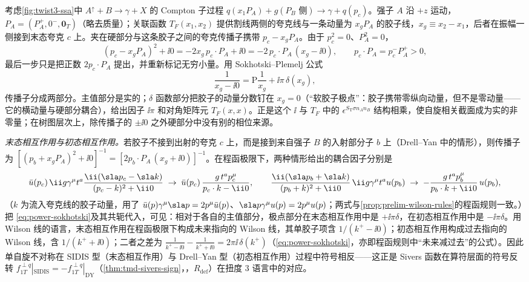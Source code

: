 \begin{example}[最低阶的软胶子极点机制]\label{ex:power-sgp}
考虑\cref{fig:twist3-ssa}中 $A^\uparrow+B\to\gamma+X$ 的 Compton 子过程 $q(x_1P_A)+g(P_B\text{ 侧})\to\gamma+q(p_c)$。强子 $A$ 沿 $+z$ 运动，$P_A=(P_A^+,0^-,\mathbf0_T)$（略去质量）；关联函数 $T_F(x_1,x_2)$ 提供割线两侧的夸克线与一条动量为 $x_gP_A$ 的胶子线，$x_g\equiv x_2-x_1$，后者在振幅一侧接到末态夸克 $c$ 上。夹在硬部分与这条胶子之间的夸克传播子携带 $p_c-x_gP_A$。由于 $p_c^2=0$、$P_A^2=0$，
\begin{equation}\label{eq:power-sgp-den}
(p_c-x_gP_A)^2+\ii0=-2x_g\,p_c\cdot P_A+\ii0=-2\,p_c\cdot P_A\,(x_g-\ii0),\qquad p_c\cdot P_A=p_c^-P_A^+>0,
\end{equation}
最后一步只是把正数 $2p_c\cdot P_A$ 提出，并重新标记无穷小量。用 Sokhotski--Plemelj 公式
\begin{equation}\label{eq:power-sokhotski}
\frac{1}{x_g-\ii0}=\mathrm P\frac{1}{x_g}+\ii\pi\,\delta(x_g),
\end{equation}
传播子分成两部分。主值部分是实的；$\delta$ 函数部分把胶子的动量分数钉在 $x_g=0$（“软胶子极点”：胶子携带零纵向动量，但不是零动量——它的横动量与硬部分耦合），给出因子 $\ii\pi$ 和对角矩阵元 $T_F(x,x)$。正是这个 $\ii$ 与 $T_F$ 中的 $\epsilon^{S_{\mathrm T}\sigma n_An_B}$ 结构相乘，使自旋相关截面成为实的非零量；在树图层次上，除传播子的 $\pm\ii0$ 之外硬部分中没有别的相位来源。

\emph{末态相互作用与初态相互作用。}若胶子不接到出射的夸克 $c$ 上，而是接到来自强子 $B$ 的入射部分子 $b$ 上（Drell--Yan 中的情形），则传播子为 $[(p_b+x_gP_A)^2+\ii0]^{-1}=[2p_b\cdot P_A\,(x_g+\ii0)]^{-1}$。在程函极限下，两种情形给出的耦合因子分别是
\begin{equation}\label{eq:power-sgp-eik}
\bar u(p_c)\,\ii g\gamma^\mu t^a\frac{\ii(\sla p_c-\sla k)}{(p_c-k)^2+\ii0}\;\to\;\bar u(p_c)\,\frac{g\,t^ap_c^\mu}{p_c\cdot k-\ii0},\qquad
\frac{\ii(\sla p_b+\sla k)}{(p_b+k)^2+\ii0}\,\ii g\gamma^\mu t^a u(p_b)\;\to\;-\frac{g\,t^ap_b^\mu}{p_b\cdot k+\ii0}\,u(p_b),
\end{equation}
（$k$ 为流入夸克线的胶子动量，用了 $\bar u(p)\gamma^\mu\sla p=2p^\mu\bar u(p)$、$\sla p\gamma^\mu u(p)=2p^\mu u(p)$；两式与\cref{prop:prelim-wilson-rules}的程函规则一致。）把 \eqref{eq:power-sokhotski}及其共轭代入，可见：相对于各自的主值部分，极点部分在末态相互作用中是 $+\ii\pi\delta$，在初态相互作用中是 $-\ii\pi\delta$。用 Wilson 线的语言，末态相互作用在程函极限下构成未来指向的 Wilson 线，其单胶子项含 $1/(k^+-\ii0)$；初态相互作用构成过去指向的 Wilson 线，含 $1/(k^++\ii0)$；二者之差为 $\frac{1}{k^+-\ii0}-\frac{1}{k^++\ii0}=2\pi\ii\,\delta(k^+)$（\cref{eq:power-sokhotski}，亦即程函规则中“未来减过去”的公式）。因此单自旋不对称在 SIDIS 型（末态相互作用）与 Drell--Yan 型（初态相互作用）过程中符号相反——这正是 Sivers 函数在算符层面的符号反转 $f^{\perp q}_{1T}|_{\mathrm{SIDIS}}=-f^{\perp q}_{1T}|_{\mathrm{DY}}$（\cref{thm:tmd-sivers-sign}，\tagR，$R_{\mathrm{def}}$）在扭度 3 语言中的对应。


\end{example}
